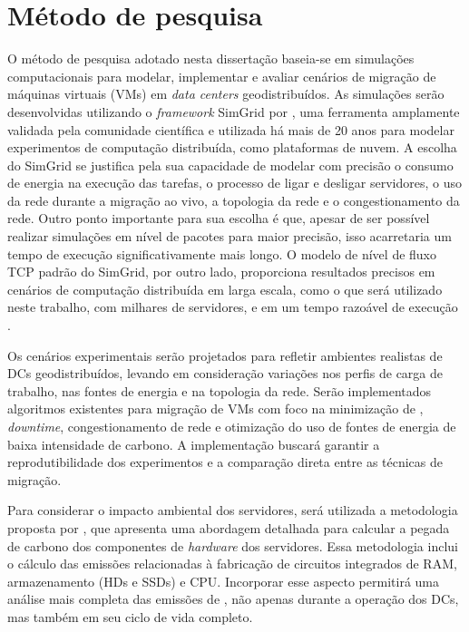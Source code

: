 \documentclass[
	12pt,				%
	oneside,			%
	a4paper,			%
	english,			%
	brazil				%
	]{abntex2ppgsi}
\begin{document}
\section{Método de pesquisa}
O método de pesquisa adotado nesta dissertação baseia-se em simulações computacionais para modelar, implementar e avaliar cenários de migração de máquinas virtuais (VMs) em \textit{data centers} geodistribuídos. As simulações serão desenvolvidas utilizando o \textit{framework} SimGrid por , uma ferramenta amplamente validada pela comunidade científica e utilizada há mais de 20 anos para modelar experimentos de computação distribuída, como plataformas de nuvem. A escolha do SimGrid se justifica pela sua capacidade de modelar com precisão o consumo de energia na execução das tarefas, o processo de ligar e desligar servidores, o uso da rede durante a migração ao vivo, a topologia da rede e o congestionamento da rede. Outro ponto importante para sua escolha é que, apesar de ser possível realizar simulações em nível de pacotes para maior precisão, isso acarretaria um tempo de execução significativamente mais longo. O modelo de nível de fluxo TCP padrão do SimGrid, por outro lado, proporciona resultados precisos em cenários de computação distribuída em larga escala, como o que será utilizado neste trabalho, com milhares de servidores, e em um tempo razoável de execução \cite{velho:hal-00872476}.

Os cenários experimentais serão projetados para refletir ambientes realistas de DCs geodistribuídos, levando em consideração variações nos perfis de carga de trabalho, nas fontes de energia e na topologia da rede. Serão implementados algoritmos existentes para migração de VMs com foco na minimização de , \textit{downtime}, congestionamento de rede e otimização do uso de fontes de energia de baixa intensidade de carbono. A implementação buscará garantir a reprodutibilidade dos experimentos e a comparação direta entre as técnicas de migração.

Para considerar o impacto ambiental dos servidores, será utilizada a metodologia proposta por , que apresenta uma abordagem detalhada para calcular a pegada de carbono dos componentes de \textit{hardware} dos servidores. Essa metodologia inclui o cálculo das emissões relacionadas à fabricação de circuitos integrados de RAM, armazenamento (HDs e SSDs) e CPU. Incorporar esse aspecto permitirá uma análise mais completa das emissões de , não apenas durante a operação dos DCs, mas também em seu ciclo de vida completo.
\end{document}
